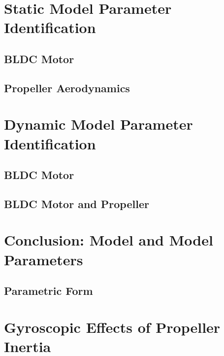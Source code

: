 \documentclass[letterpaper, 11pt]{article}
\begin{document}
\section{Static Model Parameter Identification}
\subsection{BLDC Motor}
\subsection{Propeller Aerodynamics}
\newpage


\section{Dynamic Model Parameter Identification}
\subsection{BLDC Motor}
\subsection{BLDC Motor and Propeller}
\newpage


\section{Conclusion: Model and Model Parameters}
\subsection{Parametric Form}
\newpage


\section{Gyroscopic Effects of Propeller Inertia}
\newpage
\end{document}
